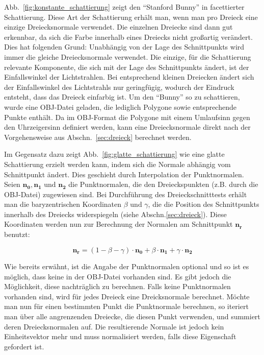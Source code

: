Abb.~\ref{fig:konstante_schattierung} zeigt den "`Stanford Bunny"' in facettierter Schattierung. Diese Art der Schattierung erhält man, wenn man pro Dreieck eine einzige Dreiecksnormale verwendet. Die einzelnen Dreiecke sind dann gut erkennbar, da sich die Farbe innerhalb eines Dreiecks nicht großartig verändert. Dies hat folgenden Grund: Unabhängig von der Lage des Schnittpunkts wird immer die gleiche Dreiecksnormale verwendet. Die einzige, für die Schattierung relevante Komponente, die sich mit der Lage des Schnittpunkts ändert, ist der Einfallswinkel der Lichtstrahlen. Bei entsprechend kleinen Dreiecken ändert sich der Einfallswinkel des Lichtstrahls nur geringfügig, wodurch der Eindruck entsteht, dass das Dreieck einfarbig ist.
Um den "`Bunny"' so zu schattieren, wurde eine OBJ-Datei geladen, die lediglich Polygone sowie entsprechende Punkte enthält. Da im OBJ-Format die Polygone mit einem Umlaufsinn gegen den Uhrzeigersinn definiert werden, kann eine Dreiecksnormale direkt nach der Vorgehensweise aus Abschn.~\ref{sec:dreieck} berechnet werden.

Im Gegensatz dazu zeigt Abb.~\ref{fig:glatte_schattierung} wie eine glatte Schattierung erzielt werden kann, indem sich die Normale abhängig vom Schnittpunkt ändert. Dies geschieht durch Interpolation der Punktnormalen. Seien \( \boldsymbol{n_0}, \boldsymbol{n_1} \text{ und } \boldsymbol{n_2} \) die Punktnormalen, die den Dreieckspunkten (z.B. durch die OBJ-Datei) zugewiesen sind. Bei Durchführung des Dreieckschnitttests erhält man die baryzentrischen Koordinaten \( \beta \text{ und } \gamma \), die die Position des Schnittpunkts innerhalb des Dreiecks widerspiegeln (siehe Abschn.\ref{sec:dreieck}). Diese Koordinaten werden nun zur Berechnung der Normalen am Schnittpunkt \( \boldsymbol{n_{\boldsymbol{r}}} \) benutzt:

\begin{equation*}
    \boldsymbol{n_{\boldsymbol{r}}} = (1 - \beta - \gamma) \cdot \boldsymbol{n_0} + \beta \cdot \boldsymbol{n_1} + \gamma \cdot \boldsymbol{n_2}
\end{equation*}

Wie bereits erwähnt, ist die Angabe der Punktnormalen optional und so ist es möglich, dass keine in der OBJ-Datei vorhanden sind. Es gibt jedoch die Möglichkeit, diese nachträglich zu berechnen. Falls keine Punktnormalen vorhanden sind, wird für jedes Dreieck eine Dreicksnormale berechnet. Möchte man nun für einen bestimmten Punkt die Punktnormale berechnen, so iteriert man über alle angrenzenden Dreiecke, die diesen Punkt verwenden, und summiert deren Dreiecksnormalen auf. Die resultierende Normale ist jedoch kein Einheitsvektor mehr und muss normalisiert werden, falls diese Eigenschaft gefordert ist.


